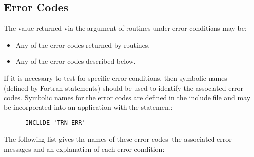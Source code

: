 \subsection{Error Codes}

The value returned via the  argument of 
routines under error conditions may be: 

\begin{itemize}

\item Any of the error codes returned by  routines.

\item Any of the error codes described below.

\end{itemize}

If it is necessary to test for specific error conditions, then symbolic
names (defined by Fortran  statements) should be used to
identify the associated error codes. 
Symbolic names for the  error codes are defined in the
include file  and may be incorporated into an application
with the statement: 

\begin{verbatim}
      INCLUDE 'TRN_ERR'
\end{verbatim}

The following list gives the names of these error codes, the associated
error messages and an explanation of each error condition: 

